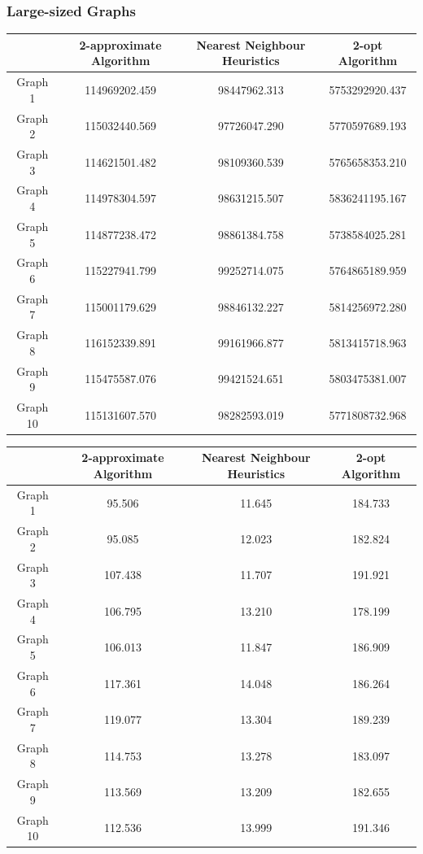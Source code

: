 \documentclass[paper=a4, fontsize=11pt]{scrartcl}	%
\numberwithin{equation}{section}		%
\numberwithin{figure}{section}			%
\numberwithin{table}{section}				%
\begin{document}
\subsubsection{Large-sized Graphs}
\begin{center}

\begin{tabular}{|c|c|c|c|}
\hline 
 & 2-approximate Algorithm & Nearest Neighbour Heuristics & 2-opt Algorithm \\ 
\hline 
Graph 1 & 114969202.459 & 98447962.313 & 5753292920.437 \\ 
\hline 
Graph 2 & 115032440.569 & 97726047.290 & 5770597689.193 \\ 
\hline 
Graph 3 & 114621501.482 & 98109360.539 & 5765658353.210\\ 
\hline 
Graph 4 & 114978304.597 & 98631215.507 & 5836241195.167 \\ 
\hline 
Graph 5 & 114877238.472 & 98861384.758 & 5738584025.281 \\ 
\hline 
Graph 6 & 115227941.799 & 99252714.075 & 5764865189.959 \\ 
\hline 
Graph 7 & 115001179.629 & 98846132.227 & 5814256972.280 \\ 
\hline 
Graph 8 & 116152339.891 & 99161966.877 & 5813415718.963 \\ 
\hline 
Graph 9 & 115475587.076 & 99421524.651 & 5803475381.007 \\ 
\hline 
Graph 10 & 115131607.570 & 98282593.019 & 5771808732.968 \\ 
\hline 
\end{tabular} 
\end{center}

\begin{center}

\begin{tabular}{|c|c|c|c|}
\hline 
 & 2-approximate Algorithm & Nearest Neighbour Heuristics & 2-opt Algorithm \\ 
\hline 
Graph 1 & 95.506 & 11.645 & 184.733 \\ 
\hline 
Graph 2 & 95.085 & 12.023 & 182.824 \\ 
\hline 
Graph 3 & 107.438 & 11.707 & 191.921  \\ 
\hline 
Graph 4 & 106.795 & 13.210 & 178.199 \\ 
\hline 
Graph 5 & 106.013 & 11.847 & 186.909 \\ 
\hline 
Graph 6 & 117.361 & 14.048 & 186.264 \\ 
\hline 
Graph 7 & 119.077 & 13.304  & 189.239 \\ 
\hline 
Graph 8 & 114.753 & 13.278 & 183.097 \\ 
\hline 
Graph 9 & 113.569 & 13.209 & 182.655 \\ 
\hline 
Graph 10 & 112.536 & 13.999 & 191.346 \\ 
\hline 
\end{tabular} 
\end{center}
\end{document}
